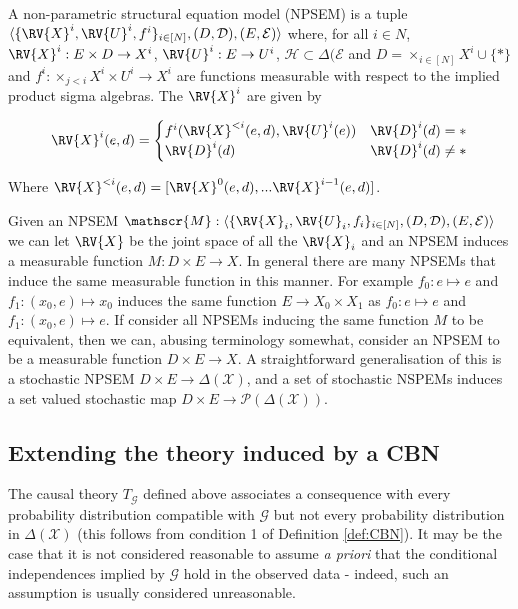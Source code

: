 \begin{definition}[NPSEM]\label{def:NPSEM}
A non-parametric structural equation model (NPSEM) is a tuple $\langle \{\RV{X}^i, \RV{U}^i, f^i\}_{i\in[N]}, (D,\mathcal{D}), (E,\mathcal{E})\rangle$ where, for all $i\in N$, $\RV{X}^i:E\times D \to X^i$, $\RV{U}^i:E\to U^i$, $\mathscr{H}\subset\Delta(\mathcal{E}$ and $D=\times_{i\in[N]} X^i\cup\{*\}$ and $f^i:\times_{j<i} X^i\times U^i\to X^i$ are functions measurable with respect to the implied product sigma algebras. The $\RV{X}^i$ are given by

\begin{align}
    \RV{X}^i(e,d) = \begin{cases} f^i(\RV{X}^{<i}(e,d),\RV{U}^i(e)) &\RV{D}^i(d)=*\\ 
    \RV{D}^i(d)  &\RV{D}^i(d)\neq * \end{cases}
\end{align}

Where $\RV{X}^{<i}(e,d)=[\RV{X}^0(e,d),...\RV{X}^{i-1}(e,d)]$.
\end{definition}

Given an NPSEM $\mathscr{M}:\langle \{\RV{X}_i, \RV{U}_i, f_i\}_{i\in[N]}, (D,\mathcal{D}), (E,\mathcal{E})\rangle$ we can let $\RV{X}$ be the joint space of all the $\RV{X}_i$ and an NPSEM induces a measurable function $M:D\times E\to X$. In general there are many NPSEMs that induce the same measurable function in this manner. For example $f_0:e\mapsto e$ and $f_1:(x_0,e)\mapsto x_0$ induces the same function $E\to X_0\times X_1$ as $f_0:e\mapsto e$ and $f_1:(x_0,e)\mapsto e$. If consider all NPSEMs inducing the same function $M$ to be equivalent, then we can, abusing terminology somewhat, consider an NPSEM to be a measurable function $D\times E\to X$. A straightforward generalisation of this is a stochastic NPSEM $D\times E\to \Delta(\mathscr{X})$, and a set of stochastic NSPEMs induces a set valued stochastic map $D\times E\to \mathscr{P}(\Delta(\mathcal{X}))$.



\subsection{Extending the theory induced by a CBN}

The causal theory $T_{\mathcal{G}}$ defined above associates a consequence with every probability distribution compatible with $\mathcal{G}$ but not every probability distribution in $\Delta(\mathcal{X})$ (this follows from condition 1 of Definition \ref{def:CBN}). It may be the case that it is not considered reasonable to assume \emph{a priori} that the conditional independences implied by $\mathcal{G}$ hold in the observed data - indeed, such an assumption is usually considered unreasonable.

